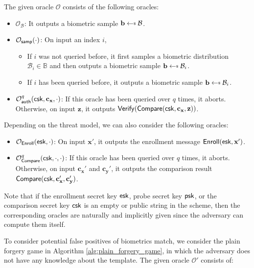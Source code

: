The given oracle $\mathcal{O}$ consists of the following oracles:

\begin{itemize}
	\item $\mathcal{O}_{\mathcal{B}}$: It outputs a biometric sample $\mathbf{b} \getsdollar \mathcal{B}$.

	\item $\mathcal{O}_{\sf samp}(\cdot)$: On input an index $i$,
	\begin{itemize}
		\item If $i$ was not queried before, it first samples a biometric distribution $\mathcal{B}_i \in \mathbb{B}$ and then outputs a biometric sample $\mathbf{b} \getsdollar \mathcal{B}_i$.
		\item If $i$ has been queried before, it outputs a biometric sample $\mathbf{b} \getsdollar \mathcal{B}_i$.
	\end{itemize}

	\item $\mathcal{O}_{\sf auth}^{q}({\sf csk}, \mathbf{c_x}, \cdot)$: If this oracle has been queried over $q$ times, it aborts. Otherwise, on input $\mathbf{z}$, it outputs ${\sf Verify}({\sf Compare}({\sf csk}, \mathbf{c_x}, \mathbf{z}))$.
\end{itemize}

Depending on the threat model, we can also consider the following oracles:

\begin{itemize}
	\item $\mathcal{O}_{\sf Enroll}({\sf esk}, \cdot)$: On input $\mathbf{x'}$, it outputs the enrollment message ${\sf Enroll}({\sf esk}, \mathbf{x'})$.

	\item $\mathcal{O}_{\sf Compare}^q({\sf csk}, \cdot, \cdot)$: If this oracle has been queried over $q$ times, it aborts. Otherwise, on input $\mathbf{c_x'}$ and $\mathbf{c_y'}$, it outputs the comparison result ${\sf Compare}( {\sf csk}, \mathbf{c_x'}, \mathbf{c_y'} )$.

\end{itemize}

Note that if the enrollment secret key ${\sf esk}$, probe secret key ${\sf psk}$, or the comparison secret key ${\sf csk}$ is an empty or public string in the scheme, then the corresponding oracles are naturally and implicitly given since the adversary can compute them itself. 

To consider potential false positives of biometrics match, we consider the plain forgery game in Algorithm \ref{alg:plain_forgery_game}, in which the adversary does not have any knowledge about the template. The given oracle $\mathcal{O'}$ consists of:

